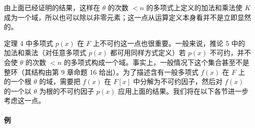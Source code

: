 由上面已经证明的结果，这样在 $\theta$ 的次数 $<n$ 的多项式上定义的加法和乘法使 $K$ 成为一个域，所以也可以除以非零元素；这一点从运算定义本身看并不是立即显然的。

定理 4 中多项式 $p(x)$ 在 $F$ 上不可约这一点也很重要。一般来说，推论 5 中的加法和乘法（对任意多项式 $p(x)$ 都可用同样方式定义）若 $p(x)$ 不可约，并不会使 $\theta$ 的次数 $<n$ 的多项式构成一个域。事实上，一般情况下这个集合甚至不是整环（其结构由第 9 章命题 16 给出）。为了描述含有一般多项式 $f(x)$ 在 $F$ 上的一个根 $\theta$ 的域，需要把 $f(x)$ 在 $F[x]$ 中分解为不可约因子，然后对 $f(x)$ 的一个以 $\theta$ 为根的不可约因子 $p(x)$ 应用上面的结果。我们将在以下各节进一步考虑这一点。

\paragraph{例}
